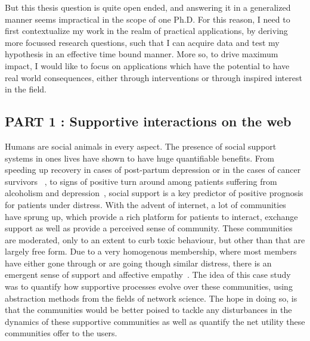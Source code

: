 \vspace{0.5cm}
\noindent{}
\vspace{0.5cm} 

But this thesis question is quite open ended, and answering it in a generalized manner seems impractical in the scope of one Ph.D. For this reason, I need to first contextualize my work in the realm  of practical applications, by deriving more focussed research questions, such that I can acquire data and test my hypothesis in an effective time bound manner. More so, to drive maximum impact, I would like to focus on applications which have the potential to have real world consequences, either through interventions or through inspired interest in the field.

\subsection{PART 1 : Supportive interactions on the web}
Humans are social animals in every aspect. The presence of social support systems in ones lives have shown to have huge quantifiable benefits. From speeding up recovery in cases of post-partum depression or in the cases of cancer survivors~\cite{collins1993social,dunkel1984social,baron1990social} , to signs of positive turn around among patients suffering from alcoholism and depression~\cite{peirce2000longitudinal,brown1986social}, social support is a key predictor of positive prognosis for patients under distress. With the advent of internet, a lot of communities have sprung up, which provide a rich platform for patients to interact, exchange support as well as provide a perceived sense of community. These communities are moderated, only to an extent to curb toxic behaviour, but other than that are largely free form. Due to a very homogenous membership, where most members have either gone through or are going though similar distress, there is an emergent sense of support and affective empathy~\cite{de2016stroke}. The idea of this case study was to quantify how supportive processes evolve over these communities, using abstraction methods from the fields of network science. The hope in doing so, is that the communities would be better poised to tackle any disturbances in the dynamics of these supportive communities as well as quantify the net utility these communities offer to the users. 

